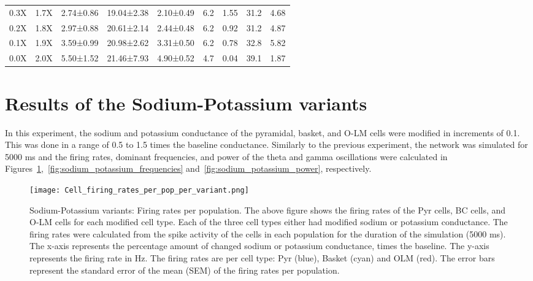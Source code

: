 \begin{table}[htbp]
\begin{adjustbox}{width=\textwidth}
\begin{tabular}{ccccccccc}
            0.3X       & 1.7X        & 2.74±0.86                     & 19.04±2.38 & 2.10±0.49 & 6.2 & 1.55 & 31.2 & 4.68 \\
            0.2X       & 1.8X        & 2.97±0.88                     & 20.61±2.14 & 2.44±0.48 & 6.2 & 0.92 & 31.2 & 4.87 \\
            0.1X       & 1.9X        & 3.59±0.99                     & 20.98±2.62 & 3.31±0.50 & 6.2 & 0.78 & 32.8 & 5.82 \\
            0.0X       & 2.0X        & 5.50±1.52                     & 21.46±7.93 & 4.90±0.52 & 4.7 & 0.04 & 39.1 & 1.87 \\
            \hline
        \end{tabular}
    \end{adjustbox}
\end{table}
\pagebreak
\section{Results of the Sodium-Potassium variants}
In this experiment, the sodium and potassium conductance of the pyramidal, basket, and O-LM cells were modified in increments of 0.1.
This was done in a range of 0.5 to 1.5 times the baseline conductance.
Similarly to the previous experiment, the network was simulated for 5000 ms and the firing rates, dominant frequencies, and power of the theta and gamma oscillations were calculated in Figures~\ref{fig:sodium_potassium_firing_rates},~\ref{fig:sodium_potassium_frequencies} and~\ref{fig:sodium_potassium_power}, respectively.

\begin{figure}[htbp]
    \centering
    \texttt{[image: Cell\_firing\_rates\_per\_pop\_per\_variant.png]}
    \caption[Sodium-Potassium variants: Firing rates per population]{Sodium-Potassium variants: Firing rates per population.
        The above figure shows the firing rates of the Pyr cells, BC cells, and O-LM cells for each modified cell type.
        Each of the three cell types either had modified sodium or potassium conductance.
        The firing rates were calculated from the spike activity of the cells in each population for the duration of the simulation (5000 ms).
        The x-axis represents the percentage amount of changed sodium or potassium conductance, times the baseline.
        The y-axis represents the firing rate in Hz.
        The firing rates are per cell type: Pyr (blue), Basket (cyan) and OLM (red).
        The error bars represent the standard error of the mean (SEM) of the firing rates per population.}\label{fig:sodium_potassium_firing_rates}
\end{figure}

